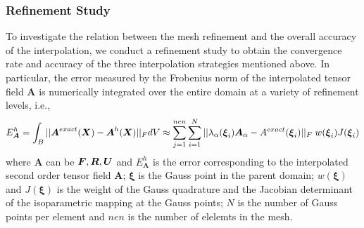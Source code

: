 \documentclass[12pt]{article}
\newcommand{\mbs}[1]{\boldsymbol{#1}}
\def\bA{{\mbs{A}}} \def\bB{{\mbs{B}}} \def\bC{{\mbs{C}}}
\def\bxi{{\mbs{\xi}}}
\begin{document}
\subsubsection{Refinement Study}
To investigate the relation between the mesh refinement and the
overall accuracy of the interpolation, we conduct a refinement study
to obtain the convergence rate and accuracy of the three interpolation
strategies mentioned above. In particular, the error measured by the
Frobenius norm of the interpolated tensor field $\bA$ is numerically
integrated over the entire domain at a variety of refinement levels,
i.e.,
\begin{equation}
  E_{\bA}^{h} =   \int_{B} ||\bA^{exact} (\bX)- \bA^{h}(\bX) ||_{F}  dV  
  \approx \sum^{nen}_{j=1}\sum^{N}_{i=1} ||
    \lambda_{\alpha} (\bxi_{i}) \bA_{\alpha} -
  A^{exact}(\bxi_{i}) ||_{F} \;
  w(\bxi_{i})  J(\bxi_{i}) 
  \label{eq:FrobeniusNormOverall}
\end{equation}
where $\bA$ can be $\bF, \bR, \bU$ and $E_{\bA}^{h}$ is the error
corresponding to the interpolated second order tensor field $\bA$;
$\bxi$ is the Gauss point in the parent domain; $w(\bxi)$ and
$J(\bxi)$ is the weight of the Gauss quadrature and the Jacobian
determinant of the isoparametric mapping at the Gauss points; $N$ is
the number of Gauss points per element and $nen$ is the number of
elelemts in the mesh.
\end{document}
